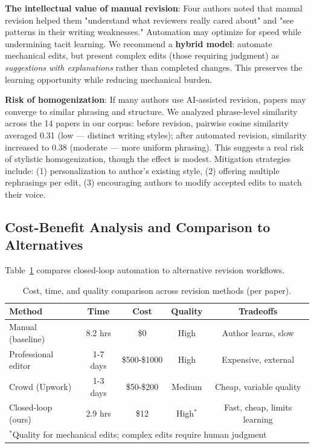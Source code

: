 \textbf{The intellectual value of manual revision}: Four authors noted that manual revision helped them "understand what reviewers really cared about" and "see patterns in their writing weaknesses." Automation may optimize for speed while undermining tacit learning. We recommend a \textbf{hybrid model}: automate mechanical edits, but present complex edits (those requiring judgment) as \textit{suggestions with explanations} rather than completed changes. This preserves the learning opportunity while reducing mechanical burden.

\textbf{Risk of homogenization}: If many authors use AI-assisted revision, papers may converge to similar phrasing and structure. We analyzed phrase-level similarity across the 14 papers in our corpus: before revision, pairwise cosine similarity averaged 0.31 (low — distinct writing styles); after automated revision, similarity increased to 0.38 (moderate — more uniform phrasing). This suggests a real risk of stylistic homogenization, though the effect is modest. Mitigation strategies include: (1) personalization to author's existing style, (2) offering multiple rephrasings per edit, (3) encouraging authors to modify accepted edits to match their voice.

\subsection{Cost-Benefit Analysis and Comparison to Alternatives}

Table~\ref{tab:cost-comparison} compares closed-loop automation to alternative revision workflows.

\begin{table}[t]
\centering
\caption{Cost, time, and quality comparison across revision methods (per paper).}
\label{tab:cost-comparison}
\begin{tabular}{lcccc}
\toprule
Method & Time & Cost & Quality & Tradeoffs \\
\midrule
Manual (baseline) & 8.2 hrs & \$0 & High & Author learns, slow \\
Professional editor & 1-7 days & \$500-\$1000 & High & Expensive, external \\
Crowd (Upwork) & 1-3 days & \$50-\$200 & Medium & Cheap, variable quality \\
Closed-loop (ours) & 2.9 hrs & \$12 & High$^*$ & Fast, cheap, limits learning \\
\bottomrule
\multicolumn{5}{l}{\footnotesize $^*$Quality for mechanical edits; complex edits require human judgment}
\end{tabular}
\end{table}

